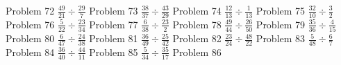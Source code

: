 \documentclass{article}
\begin{document}
Problem 72
\newline
\hfill \break
$\displaystyle \frac{49}{21} \div \frac{29}{7}$
\newline
\hfill \break
Problem 73
\newline
\hfill \break
$\displaystyle \frac{38}{37} \div \frac{43}{29}$
\newline
\hfill \break
Problem 74
\newline
\hfill \break
$\displaystyle \frac{12}{13} \div \frac{1}{13}$
\newline
\hfill \break
Problem 75
\newline
\hfill \break
$\displaystyle \frac{32}{10} \div \frac{3}{2}$
\newline
\hfill \break
Problem 76
\newline
\hfill \break
$\displaystyle \frac{5}{22} \div \frac{23}{34}$
\newline
\hfill \break
Problem 77
\newline
\hfill \break
$\displaystyle \frac{6}{38} \div \frac{23}{2}$
\newline
\hfill \break
Problem 78
\newline
\hfill \break
$\displaystyle \frac{49}{44} \div \frac{26}{50}$
\newline
\hfill \break
Problem 79
\newline
\hfill \break
$\displaystyle \frac{35}{36} \div \frac{4}{15}$
\newline
\hfill \break
Problem 80
\newline
\hfill \break
$\displaystyle \frac{6}{47} \div \frac{24}{38}$
\newline
\hfill \break
Problem 81
\newline
\hfill \break
$\displaystyle \frac{36}{49} \div \frac{25}{42}$
\newline
\hfill \break
Problem 82
\newline
\hfill \break
$\displaystyle \frac{23}{24} \div \frac{48}{22}$
\newline
\hfill \break
Problem 83
\newline
\hfill \break
$\displaystyle \frac{5}{48} \div \frac{6}{7}$
\newline
\hfill \break
Problem 84
\newline
\hfill \break
$\displaystyle \frac{36}{40} \div \frac{44}{11}$
\newline
\hfill \break
Problem 85
\newline
\hfill \break
$\displaystyle \frac{5}{34} \div \frac{35}{17}$
\newline
\hfill \break
Problem 86
\end{document}
